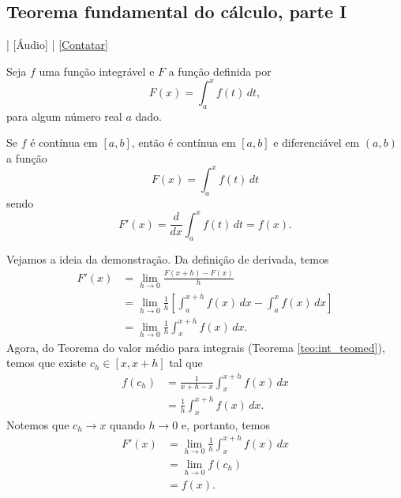 \subsection{Teorema fundamental do cálculo, parte I}

\begin{flushright}
  [Vídeo] | [Áudio] | \href{https://phkonzen.github.io/notas/contato.html}{[Contatar]}
\end{flushright}

Seja $f$ uma função integrável e $F$ a função definida por
\begin{equation}
  F(x) = \int_a^x f(t)\,dt,
\end{equation}
para algum número real $a$ dado.

\begin{teo}\label{teo:int_tfc1}
  Se $f$ é contínua em $[a, b]$, então é contínua em $[a, b]$ e diferenciável em $(a, b)$ a função
  \begin{equation}
    F(x) = \int_a^x f(t)\,dt
  \end{equation}
  sendo
  \begin{equation}
    F'(x) = \frac{d}{dx}\int_a^x f(t)\,dt = f(x).
  \end{equation}
\end{teo}
\begin{dem}
  Vejamos a ideia da demonstração. Da definição de derivada, temos
  \begin{align}
    F'(x) &= \lim_{h\to 0} \frac{F(x+h) - F(x)}{h} \\
          &= \lim_{h\to 0} \frac{1}{h}\left[\int_a^{x+h} f(x)\,dx - \int_a^x f(x)\, dx\right] \\
          &= \lim_{h\to 0} \frac{1}{h}\int_x^{x+h} f(x)\,dx.
  \end{align}
  Agora, do Teorema do valor médio para integrais (Teorema \ref{teo:int_teomed}), temos que existe $c_h \in [x, x+h]$ tal que
  \begin{align}
    f(c_h) &= \frac{1}{x+h-x}\int_x^{x+h} f(x)\,dx \\
           &= \frac{1}{h}\int_x^{x+h} f(x)\,dx.
  \end{align}
  Notemos que $c_h\to x$ quando $h\to 0$ e, portanto, temos
  \begin{align}
    F'(x) &= \lim_{h\to 0} \frac{1}{h}\int_x^{x+h} f(x)\,dx \\
          &= \lim_{h\to 0} f(c_h) \\
          &= f(x).
  \end{align}
\end{dem}

